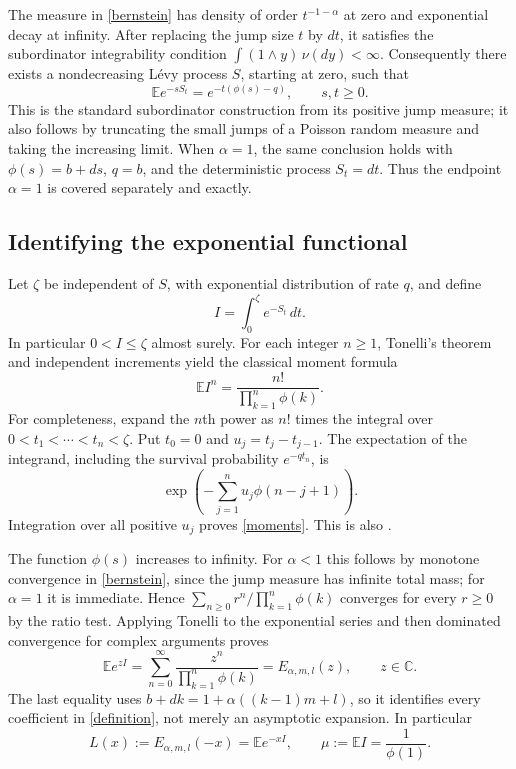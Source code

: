 \documentclass[11pt]{article}
\newcommand{\EE}{\mathbb E}
\begin{document}
The measure in \eqref{bernstein} has density of order
$t^{-1-\alpha}$ at zero and exponential decay at infinity.
After replacing the jump size $t$ by $dt$, it satisfies the
subordinator integrability condition $\int(1\wedge y)\,\nu(dy)<\infty$.
Consequently there exists a nondecreasing L\'evy process $S$, starting
at zero, such that
\begin{equation}\label{laplace}
 \EE e^{-sS_t}=e^{-t(\phi(s)-q)},\qquad s,t\geq0.
\end{equation}
This is the standard subordinator construction from its positive
jump measure; it also follows by truncating the small jumps of a
Poisson random measure and taking the increasing limit.
When $\alpha=1$, the same conclusion holds with
$\phi(s)=b+ds$, $q=b$, and the deterministic process $S_t=dt$.
Thus the endpoint $\alpha=1$ is covered separately and exactly.

\subsection*{Identifying the exponential functional}
Let $\zeta$ be independent of $S$, with exponential distribution of
rate $q$, and define
\[
 I=\int_0^\zeta e^{-S_t}\,dt.
\]
In particular $0<I\leq\zeta$ almost surely. For each integer $n\geq1$,
Tonelli's theorem and independent increments yield the classical
moment formula
\begin{equation}\label{moments}
 \EE I^n=\frac{n!}{\prod_{k=1}^n\phi(k)}.
\end{equation}
For completeness, expand the $n$th power as $n!$ times the integral
over $0<t_1<\cdots<t_n<\zeta$. Put $t_0=0$ and
$u_j=t_j-t_{j-1}$. The expectation of the integrand, including the
survival probability $e^{-qt_n}$, is
\[
 \exp\left(-\sum_{j=1}^n u_j\phi(n-j+1)\right).
\]
Integration over all positive $u_j$ proves \eqref{moments}. This is
also \cite[Theorem 2(i)]{BY}.

The function $\phi(s)$ increases to infinity. For $\alpha<1$ this
follows by monotone convergence in \eqref{bernstein}, since the
jump measure has infinite total mass; for $\alpha=1$ it is immediate.
Hence $\sum_{n\geq0}r^n/\prod_{k=1}^n\phi(k)$ converges for every
$r\geq0$ by the ratio test. Applying Tonelli to the exponential
series and then dominated convergence for complex arguments proves
\begin{equation}\label{representation}
 \EE e^{zI}=\sum_{n=0}^\infty\frac{z^n}{\prod_{k=1}^n\phi(k)}
            =E_{\alpha,m,l}(z),\qquad z\in\mathbb C.
\end{equation}
The last equality uses $b+dk=1+\alpha((k-1)m+l)$, so it identifies
every coefficient in \eqref{definition}, not merely an asymptotic
expansion. In particular
\[
 L(x):=E_{\alpha,m,l}(-x)=\EE e^{-xI},\qquad
 \mu:=\EE I=\frac1{\phi(1)}.
\]
\end{document}

